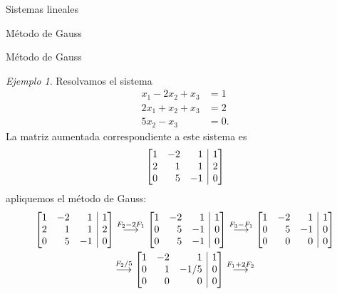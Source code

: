 \documentclass[a4paper,12pt,twoside,spanish,reqno]{amsbook}
\numberwithin{equation}{section}
\theoremstyle{definition}
\theoremstyle{remark}
\newtheorem*{ejemplo*}{Ejemplo}
\begin{document}
\begin{chapter}{Sistemas lineales}
\begin{section}{Método de Gauss }
\begin{subsection}{Método de Gauss}
            
                \begin{ejemplo*} Resolvamos el sistema
                    \begin{align*}
                    x_1 -2x_2 + x_3  &= 1\\
                    2x_1 +x_2 + x_3  &= 2\\
                    5x_2 - x_3  &= 0.
                    \end{align*}
                    La matriz  aumentada correspondiente a este sistema es
                    \begin{equation*}
                     \left[\begin{array}{@{}*{3}{r}|r@{}} 
                     1 & -2 & 1 &  1 \\ 2 & 1 & 1 &  2 \\ 0 & 5 & -1 &  0 
                    \end{array}\right]
                    \end{equation*}
                    apliquemos el método de Gauss:
                    \begin{multline*}
                    \left[\begin{array}{@{}*{3}{r}|r@{}}1 & -2 & 1 &  1 \\ 2 & 1 & 1 &  2 \\	0 & 5 & -1 &  0  \end{array}\right]
                    \stackrel{F_2 - 2F_1}{\longrightarrow} 
                    \left[\begin{array}{@{}*{3}{r}|r@{}}1 & -2 & 1 &  1 \\ 0 & 5 & -1 &  0 \\	0 & 5 & -1 &  0  \end{array}\right]
                    \stackrel{F_3-F_1}{\longrightarrow} 
                    \left[\begin{array}{@{}*{3}{r}|r@{}}1 & -2 & 1 &  1 \\ 0 & 5 & -1 &  0 \\	0 & 0 & 0 & 0  \end{array}\right]
                    \\
                    \stackrel{F_2/5}{\longrightarrow} 
                    \left[\begin{array}{@{}*{3}{r}|r@{}}1 & -2 & 1 &  1 \\ 0 & 1 & -1/5 &  0 \\	0 & 0 & 0 &  0  \end{array}\right]
                    \stackrel{F_1+2 F_2}{\longrightarrow} 

\end{multline*}
\end{ejemplo*}
\end{subsection}
\end{section}
\end{chapter}
\end{document}
